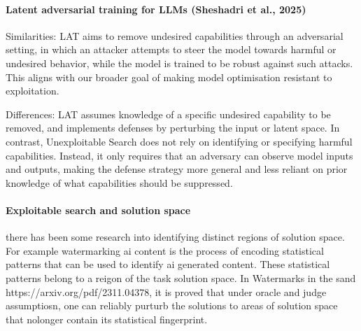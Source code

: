 \paragraph{Latent adversarial training for LLMs (Sheshadri et al., 2025) \cite{sheshadri_latent_2025}}

Similarities: LAT aims to remove undesired capabilities through an adversarial setting, in which an attacker attempts to steer the model towards harmful or undesired behavior, while the model is trained to be robust against such attacks. This aligns with our broader goal of making model optimisation resistant to exploitation.

Differences: LAT assumes knowledge of a specific undesired capability to be removed, and implements defenses by perturbing the input or latent space. In contrast, Unexploitable Search does not rely on identifying or specifying harmful capabilities. Instead, it only requires that an adversary can observe model inputs and outputs, making the defense strategy more general and less reliant on prior knowledge of what capabilities should be suppressed.

\paragraph{Exploitable search and solution space}

there has been some research into identifying distinct regions of solution space. For example watermarking ai content is the process of encoding statistical patterns that can be used to identify ai generated content. These statistical patterns belong to a reigon of the task solution space. In Watermarks in the sand https://arxiv.org/pdf/2311.04378, it is proved that under oracle and judge assumptiosn, one can reliably purturb the solutions to areas of solution space that nolonger contain its statistical fingerprint.   











